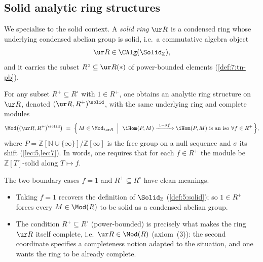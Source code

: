\subsection{Solid analytic ring structures}

We specialise to the solid context. A \emph{solid ring} $\ur R$ is a condensed
ring whose underlying condensed abelian group is solid, i.e.\ a commutative
algebra object
\begin{equation*}
\ur R\in\CAlg(\Solid_{\mathbb{Z}}),
\end{equation*}
and it carries the subset $R^{\circ}\subseteq\ur R(\ast)$ of power-bounded
elements (\cref{def:7:tn-pb}).

\begin{definition}
\label{def:9:solid-structure}
For any subset $R^{+}\subseteq R^{\circ}$ with $1\in R^{+}$, one obtains an
analytic ring structure on $\ur R$, denoted $(\ur R,R^{+})^{\solid}$, with the
same underlying ring and complete modules
\begin{equation}
\label{eq:9:solid-mod}
\Mod\bigl((\ur R,R^{+})^{\solid}\bigr)\ =\ \Bigl\{\, M\in\Mod_{\ur R}\ \Bigm|\
\iHom(P,M)\xrightarrow{\ 1-\sigma f\ }\iHom(P,M)\ \text{is an iso}\ \forall f\in
R^{+}\,\Bigr\},
\end{equation}
where $P=\mathbb{Z}[\mathbb{N}\cup\{\infty\}]/\mathbb{Z}[\infty]$ is the free
group on a null sequence and $\sigma$ its shift (\cref{lec:5,lec:7}). In words,
one requires that for each $f\in R^{+}$ the module be $\mathbb{Z}[T]$-solid
along $T\mapsto f$.
\end{definition}

\begin{remark}
\label{rmk:9:reading-conditions}
The two boundary cases $f=1$ and $R^{+}\subseteq R^{\circ}$ have clean meanings.
\begin{itemize}
\item Taking $f=1$ recovers the definition of $\Solid_{\mathbb{Z}}$
(\cref{def:5:solid}); so $1\in R^{+}$ forces every $M\in\Mod(R)$ to be solid as
a condensed abelian group.
\item The condition $R^{+}\subseteq R^{\circ}$ (power-bounded) is precisely what
makes the ring $\ur R$ itself complete, i.e.\ $\ur R\in\Mod(R)$ (axiom~(3)):
the second coordinate specifies a completeness notion adapted to the situation,
and one wants the ring to be already complete.
\end{itemize}
\end{remark}

